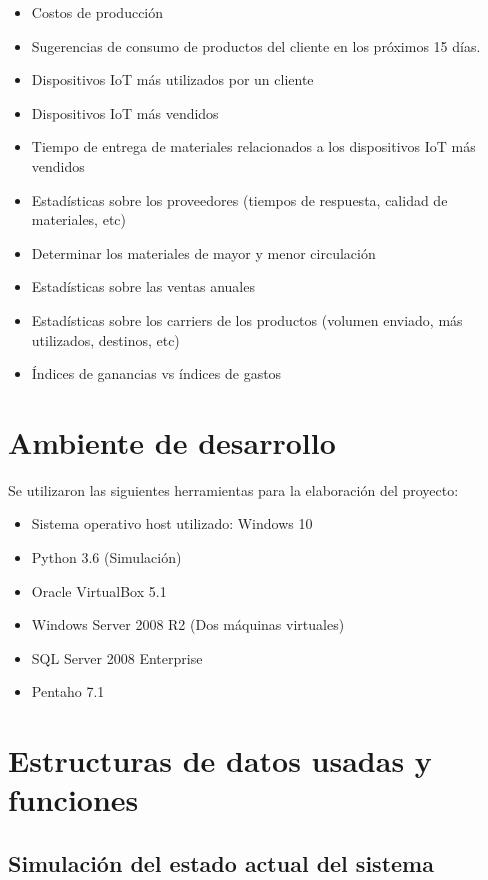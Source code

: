 \documentclass{article}
\begin{document}
\begin{itemize}
  \item Costos de producci\'on
  \item Sugerencias de consumo de productos del cliente en los pr\'oximos 15 d\'ias.
  \item Dispositivos IoT m\'as utilizados por un cliente
  \item Dispositivos IoT m\'as vendidos
  \item Tiempo de entrega de materiales relacionados a los dispositivos IoT m\'as vendidos
  \item Estad\'isticas sobre los proveedores (tiempos de respuesta, calidad de materiales, etc)
  \item Determinar los materiales de mayor y menor circulaci\'on
  \item Estad\'isticas sobre las ventas anuales
  \item Estad\'isticas sobre los carriers de los productos (volumen enviado, m\'as utilizados, destinos, etc)
  \item \'Indices de ganancias vs \'indices de gastos
\end{itemize}

\section{Ambiente de desarrollo}

Se utilizaron las siguientes herramientas para la elaboraci\'on del proyecto:
\begin{itemize}
  \item Sistema operativo host utilizado: Windows 10
  \item Python 3.6 (Simulaci\'on)
  \item Oracle VirtualBox 5.1
  \item Windows Server 2008 R2 (Dos m\'aquinas virtuales)
  \item SQL Server 2008 Enterprise
  \item Pentaho 7.1
\end{itemize}

\section{Estructuras de datos usadas y funciones}

\subsection {Simulaci\'on del estado actual del sistema}
\end{document}
